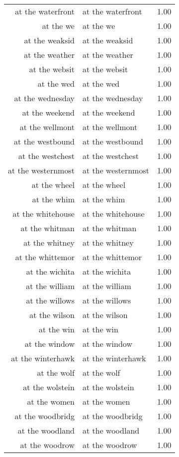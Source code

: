 \begin{table}[ht]
\begin{tabular}{rlr}
  at the waterfront & at the waterfront & 1.00 \\ 
  at the we & at the we & 1.00 \\ 
  at the weaksid & at the weaksid & 1.00 \\ 
  at the weather & at the weather & 1.00 \\ 
  at the websit & at the websit & 1.00 \\ 
  at the wed & at the wed & 1.00 \\ 
  at the wednesday & at the wednesday & 1.00 \\ 
  at the weekend & at the weekend & 1.00 \\ 
  at the wellmont & at the wellmont & 1.00 \\ 
  at the westbound & at the westbound & 1.00 \\ 
  at the westchest & at the westchest & 1.00 \\ 
  at the westernmost & at the westernmost & 1.00 \\ 
  at the wheel & at the wheel & 1.00 \\ 
  at the whim & at the whim & 1.00 \\ 
  at the whitehouse & at the whitehouse & 1.00 \\ 
  at the whitman & at the whitman & 1.00 \\ 
  at the whitney & at the whitney & 1.00 \\ 
  at the whittemor & at the whittemor & 1.00 \\ 
  at the wichita & at the wichita & 1.00 \\ 
  at the william & at the william & 1.00 \\ 
  at the willows & at the willows & 1.00 \\ 
  at the wilson & at the wilson & 1.00 \\ 
  at the win & at the win & 1.00 \\ 
  at the window & at the window & 1.00 \\ 
  at the winterhawk & at the winterhawk & 1.00 \\ 
  at the wolf & at the wolf & 1.00 \\ 
  at the wolstein & at the wolstein & 1.00 \\ 
  at the women & at the women & 1.00 \\ 
  at the woodbridg & at the woodbridg & 1.00 \\ 
  at the woodland & at the woodland & 1.00 \\ 
  at the woodrow & at the woodrow & 1.00 \\ 

\end{tabular}
\end{table}
